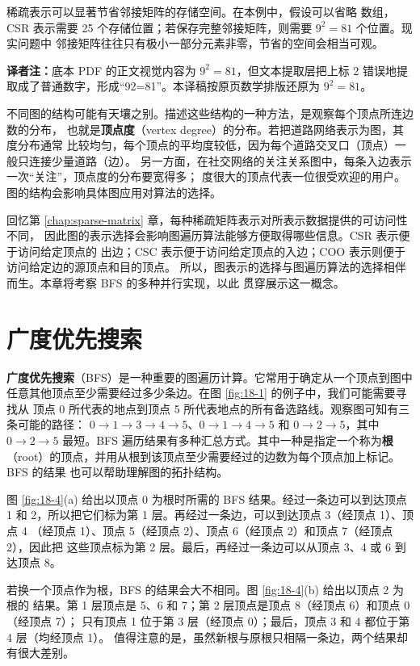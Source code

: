 稀疏表示可以显著节省邻接矩阵的存储空间。在本例中，假设可以省略  数组，
CSR 表示需要 25 个存储位置；若保存完整邻接矩阵，则需要 $9^2=81$ 个位置。现实问题中
邻接矩阵往往只有极小一部分元素非零，节省的空间会相当可观。

\noindent\textbf{译者注：}底本 PDF 的正文视觉内容为 $9^2=81$，但文本提取层把上标 2
错误地提取成了普通数字，形成“92=81”。本译稿按原页数学排版还原为 $9^2=81$。

不同图的结构可能有天壤之别。描述这些结构的一种方法，是观察每个顶点所连边数的分布，
也就是\textbf{顶点度}（vertex degree）的分布。若把道路网络表示为图，其度分布通常
比较均匀，每个顶点的平均度较低，因为每个道路交叉口（顶点）一般只连接少量道路（边）。
另一方面，在社交网络的关注关系图中，每条入边表示一次“关注”，顶点度的分布要宽得多；
度很大的顶点代表一位很受欢迎的用户。图的结构会影响具体图应用对算法的选择。

回忆第 \ref{chap:sparse-matrix} 章，每种稀疏矩阵表示对所表示数据提供的可访问性不同，
因此图的表示选择会影响图遍历算法能够方便取得哪些信息。CSR 表示便于访问给定顶点的
出边；CSC 表示便于访问给定顶点的入边；COO 表示则便于访问给定边的源顶点和目的顶点。
所以，图表示的选择与图遍历算法的选择相伴而生。本章将考察 BFS 的多种并行实现，以此
贯穿展示这一概念。

\section{广度优先搜索}
\label{sec:breadth-first-search}

\textbf{广度优先搜索}（BFS）是一种重要的图遍历计算。它常用于确定从一个顶点到图中
任意其他顶点至少需要经过多少条边。在图 \ref{fig:18-1} 的例子中，我们可能需要寻找从
顶点 0 所代表的地点到顶点 5 所代表地点的所有备选路线。观察图可知有三条可能的路径：
$0\to1\to3\to4\to5$、$0\to1\to4\to5$ 和 $0\to2\to5$，其中
$0\to2\to5$ 最短。BFS 遍历结果有多种汇总方式。其中一种是指定一个称为\textbf{根}
（root）的顶点，并用从根到该顶点至少需要经过的边数为每个顶点加上标记。BFS 的结果
也可以帮助理解图的拓扑结构。

图 \ref{fig:18-4}(a) 给出以顶点 0 为根时所需的 BFS 结果。经过一条边可以到达顶点 1
和 2，所以把它们标为第 1 层。再经过一条边，可以到达顶点 3（经顶点 1）、顶点 4
（经顶点 1）、顶点 5（经顶点 2）、顶点 6（经顶点 2）和顶点 7（经顶点 2），因此把
这些顶点标为第 2 层。最后，再经过一条边可以从顶点 3、4 或 6 到达顶点 8。

若换一个顶点作为根，BFS 的结果会大不相同。图 \ref{fig:18-4}(b) 给出以顶点 2 为根的
结果。第 1 层顶点是 5、6 和 7；第 2 层顶点是顶点 8（经顶点 6）和顶点 0（经顶点 7）；
只有顶点 1 位于第 3 层（经顶点 0）；最后，顶点 3 和 4 都位于第 4 层（均经顶点 1）。
值得注意的是，虽然新根与原根只相隔一条边，两个结果却有很大差别。

